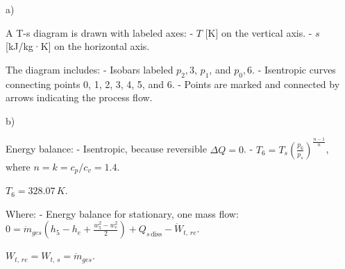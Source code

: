 a)  

A T-s diagram is drawn with labeled axes:  
- \( T \) [K] on the vertical axis.  
- \( s \) [kJ/kg·K] on the horizontal axis.  

The diagram includes:  
- Isobars labeled \( p_2,3 \), \( p_1 \), and \( p_0,6 \).  
- Isentropic curves connecting points 0, 1, 2, 3, 4, 5, and 6.  
- Points are marked and connected by arrows indicating the process flow.  

b)  

Energy balance:  
- Isentropic, because reversible \( \Delta Q = 0 \).  
- \( T_6 = T_s \left( \frac{p_6}{p_s} \right)^{\frac{n-1}{n}} \), where \( n = k = c_p / c_v = 1.4 \).  

\( T_6 = 328.07 \, K \).  

Where:  
- Energy balance for stationary, one mass flow:  
  \( 0 = \dot{m}_{ges} (h_5 - h_e + \frac{w_5^2 - w_e^2}{2}) + Q_{s \, \text{diss}} - \dot{W}_{t, \, re} \).  

\( W_{t, \, re} = W_{t, \, s} = \dot{m}_{ges} \).